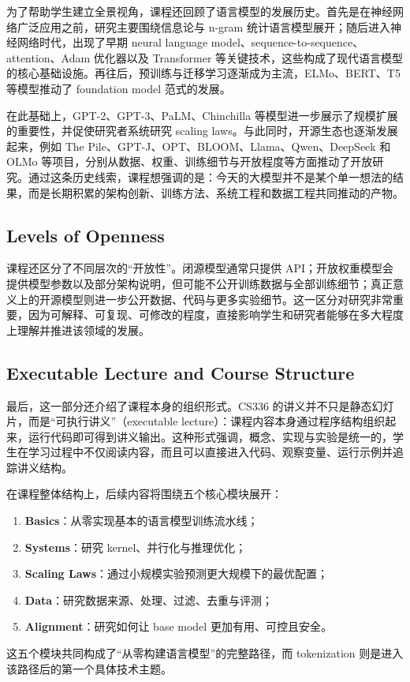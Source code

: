 \documentclass[a4paper,UTF8]{article}
\numberwithin{equation}{section}
\begin{document}
为了帮助学生建立全景视角，课程还回顾了语言模型的发展历史。首先是在神经网络广泛应用之前，研究主要围绕信息论与 n-gram 统计语言模型展开；随后进入神经网络时代，出现了早期 neural language model、sequence-to-sequence、attention、Adam 优化器以及 Transformer 等关键技术，这些构成了现代语言模型的核心基础设施。再往后，预训练与迁移学习逐渐成为主流，ELMo、BERT、T5 等模型推动了 foundation model 范式的发展。

在此基础上，GPT-2、GPT-3、PaLM、Chinchilla 等模型进一步展示了规模扩展的重要性，并促使研究者系统研究 scaling laws。与此同时，开源生态也逐渐发展起来，例如 The Pile、GPT-J、OPT、BLOOM、Llama、Qwen、DeepSeek 和 OLMo 等项目，分别从数据、权重、训练细节与开放程度等方面推动了开放研究。通过这条历史线索，课程想强调的是：今天的大模型并不是某个单一想法的结果，而是长期积累的架构创新、训练方法、系统工程和数据工程共同推动的产物。

\subsection{Levels of Openness}

课程还区分了不同层次的“开放性”。闭源模型通常只提供 API；开放权重模型会提供模型参数以及部分架构说明，但可能不公开训练数据与全部训练细节；真正意义上的开源模型则进一步公开数据、代码与更多实验细节。这一区分对研究非常重要，因为可解释、可复现、可修改的程度，直接影响学生和研究者能够在多大程度上理解并推进该领域的发展。

\subsection{Executable Lecture and Course Structure}

最后，这一部分还介绍了课程本身的组织形式。CS336 的讲义并不只是静态幻灯片，而是“可执行讲义”（executable lecture）：课程内容本身通过程序结构组织起来，运行代码即可得到讲义输出。这种形式强调，概念、实现与实验是统一的，学生在学习过程中不仅阅读内容，而且可以直接进入代码、观察变量、运行示例并追踪讲义结构。

在课程整体结构上，后续内容将围绕五个核心模块展开：
\begin{enumerate}
    \item \textbf{Basics}：从零实现基本的语言模型训练流水线；
    \item \textbf{Systems}：研究 kernel、并行化与推理优化；
    \item \textbf{Scaling Laws}：通过小规模实验预测更大规模下的最优配置；
    \item \textbf{Data}：研究数据来源、处理、过滤、去重与评测；
    \item \textbf{Alignment}：研究如何让 base model 更加有用、可控且安全。
\end{enumerate}
这五个模块共同构成了“从零构建语言模型”的完整路径，而 tokenization 则是进入该路径后的第一个具体技术主题。
\end{document}
